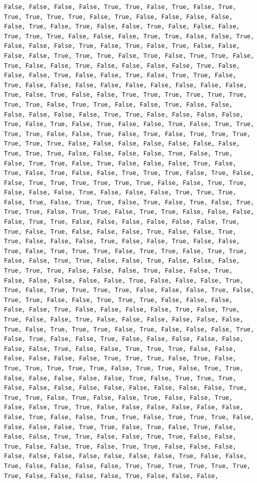 \documentclass[
  letterpaper,
  DIV=11,
  numbers=noendperiod]{scrartcl}
\begin{document}
\begin{verbatim}
False, False, False, False, True, True, False, True, False, True, True, True, True, True, False, True, False, False, False, False, False, True, False, True, False, False, True, False, False, False, True, True, True, False, False, False, True, True, False, False, True, False, False, False, True, False, True, False, True, False, False, False, False, True, True, True, False, True, False, True, True, False, True, False, False, True, False, False, False, False, True, False, False, False, True, False, False, True, False, True, True, False, True, False, False, False, False, False, False, False, False, False, True, False, True, False, False, True, True, True, True, True, True, True, True, False, True, True, False, False, True, False, False, False, False, False, False, True, True, False, False, False, False, True, False, True, False, True, False, False, True, False, True, True, True, True, False, False, True, False, True, False, True, True, True, True, True, True, False, False, False, False, False, False, False, True, True, True, False, False, False, False, True, False, True, False, True, True, False, True, False, False, False, True, False, True, False, True, False, False, True, True, True, False, True, False, False, True, True, True, True, True, True, False, False, True, True, False, False, False, True, False, False, False, True, True, True, False, True, False, True, True, False, True, False, True, False, True, True, True, False, True, True, False, True, True, False, False, False, False, True, True, False, False, False, False, False, False, True, True, False, True, False, False, False, True, False, False, True, True, False, False, False, True, False, False, True, False, False, True, False, True, True, True, False, True, True, False, True, True, False, False, True, True, False, False, True, False, False, False, True, True, True, False, False, False, True, False, False, True, False, False, False, False, False, True, False, False, False, True, True, False, True, True, True, True, False, False, False, True, False, True, True, False, False, True, True, True, False, False, False, False, False, True, False, False, False, False, True, False, True, True, False, False, True, False, False, False, False, False, False, True, False, True, True, True, False, True, False, False, False, True, False, True, False, False, True, False, False, False, False, False, False, False, True, False, False, True, True, True, False, False, False, False, False, False, True, True, True, False, True, False, True, True, True, True, True, False, True, True, False, True, True, False, False, False, False, False, True, False, True, True, True, False, False, False, False, False, False, False, False, False, True, True, True, False, True, False, False, True, False, False, True, False, False, True, True, False, False, False, False, False, False, False, True, False, False, True, True, False, True, True, True, False, False, False, False, True, True, False, True, False, True, False, False, False, True, True, False, False, True, True, False, False, True, False, False, True, False, True, True, False, False, False, False, False, False, False, False, False, False, True, False, False, True, False, False, False, False, True, True, True, True, True, True, True, False, False, False, False, True, False, False, False, 
\end{verbatim}
\end{document}
